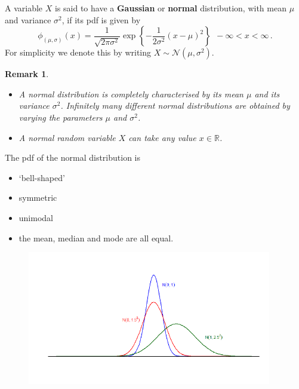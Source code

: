 \documentclass[notes=show,smaller,handout]{beamer}\usepackage[]{graphicx}\usepackage[]{color}
\newtheorem{remark}{Remark}[section]
\newcommand{\N}{\mathcal{N}}
\newenvironment{stepitemize}{\begin{itemize}[<+->]}{\end{itemize} }
\begin{document}
\begin{frame}{\subsecname}

  \begin{definition}
  A variable $X$ is said to have a \textbf{Gaussian} or \textbf{normal}
  distribution, with mean $\mu $ and variance $\sigma ^{2}$, if its pdf is given by
  \begin{equation*}
  \phi_{(\mu,\sigma)}(x) =\frac{1}{\sqrt{2\pi \sigma ^{2}}}\exp{ \left\{ -\frac{1%
  }{2\sigma ^{2}}\left( x-\mu \right) ^{2}\right\}}~~-\infty<x<\infty\,.
  \end{equation*}
  For simplicity we denote this by writing $X\sim \N\left( \mu ,\sigma ^{2}\right) $.
  \end{definition}
  \pause
  \begin{remark}
  \begin{itemize}
  \item A normal distribution is completely characterised by its mean $\mu $ and its variance $\sigma ^{2}$. Infinitely many different normal distributions are obtained by varying the parameters $\mu $ and $\sigma ^{2}$.
  \item A normal random variable $X$ can take any value $x\in\mathbb{R}$.
  \end{itemize}
  \end{remark}
\end{frame}

\begin{frame}{\subsecname}
  The pdf of the normal distribution is
  \begin{stepitemize}
  \item `bell-shaped'
  \item symmetric
  \item unimodal
  \item the mean, median and mode are all equal.
  \end{stepitemize}
  \begin{figure}[ptb]\centering
  \includegraphics[width=0.95\textwidth,height=0.75\textheight]{img/normals4.pdf}%
  \end{figure}
\end{frame}
\end{document}
